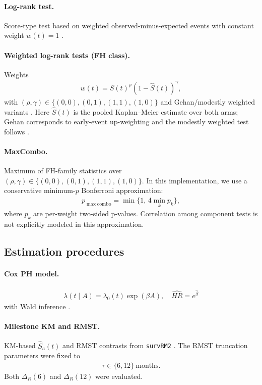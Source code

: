 \documentclass[11pt]{article}
\begin{document}
\paragraph{Log-rank test.}
Score-type test based on weighted observed-minus-expected events with constant weight $w(t)=1$ \citep{harrington1982,fleming1991}.

\paragraph{Weighted log-rank tests (FH class).}
Weights
\begin{align}
w(t)=\hat S(t)^{\rho}(1-\hat S(t))^{\gamma},
\end{align}
with $(\rho,\gamma)\in\{(0,0),(0,1),(1,1),(1,0)\}$ and Gehan/modestly weighted variants \citep{harrington1982,magirr2019}. Here $\hat S(t)$ is the pooled Kaplan--Meier estimate over both arms; Gehan corresponds to early-event up-weighting and the modestly weighted test follows \citet{magirr2019}.

\paragraph{MaxCombo.}
Maximum of FH-family statistics over $(\rho,\gamma)\in\{(0,0),(0,1),(1,1),(1,0)\}$. In this implementation, we use a conservative minimum-$p$ Bonferroni approximation:
\begin{align}
p_{\max\mathrm{combo}} = \min\{1,\,4\min_k p_k\},
\end{align}
where $p_k$ are per-weight two-sided p-values. Correlation among component tests is not explicitly modeled in this approximation.

\subsection{Estimation procedures}
\paragraph{Cox PH model.}
\begin{align}
\lambda(t\mid A)=\lambda_0(t)\exp(\beta A),\quad \widehat{HR}=e^{\hat\beta}
\end{align}
with Wald inference \citep{cox1972}.

\paragraph{Milestone KM and RMST.}
KM-based $\widehat S_a(t)$ and RMST contrasts from \texttt{survRM2} \citep{cho2021,uno2014}. The RMST truncation parameters were fixed to
\begin{align}
\tau \in \{6,12\}\ \text{months}.
\end{align}
Both $\Delta_R(6)$ and $\Delta_R(12)$ were evaluated.
\end{document}
